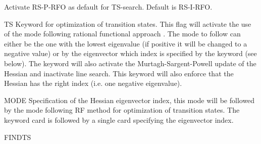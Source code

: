 \begin{keywordlist}
Activate RS-P-RFO \cite{rs-rf} as default for TS-search. Default is RS-I-RFO.
\item[TS  ]
Keyword for optimization of transition states. This flag will activate
the use of the mode following rational functional approach \cite{mfrf}.
The mode to follow can either be the one with the lowest eigenvalue (if positive
it will be changed to a negative value) or by the eigenvector which index
is specified by the  keyword (see below). The keyword will also
activate the Murtagh-Sargent-Powell update of the Hessian and inactivate
line search. This keyword will also enforce that the Hessian has the
right index (i.e. one negative eigenvalue).
\item[MODE]
Specification of the Hessian eigenvector index, this mode will be followed
by the mode following RF method for optimization of transition states.
The keyword card is followed by a single card specifying the eigenvector index.
\item[FINDTS]

\end{keywordlist}
